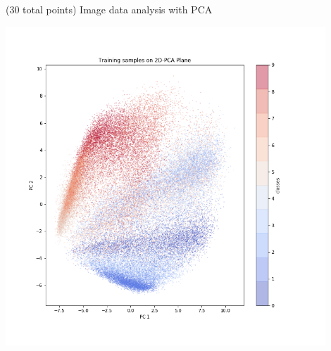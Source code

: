\documentclass[12pt]{article}
\begin{document}
\begin{question}{(30 total points) Image data analysis with PCA}
\begin{subquestion}
   

      \begin{answerbox}{40em}
         \begin{center}
             \includegraphics[width=0.9\textwidth]{results/1_8.png}
         \end{center}
      \end{answerbox}
  


   \end{subquestion}
   

\end{question}
\clearpage
%
%
\end{document}
